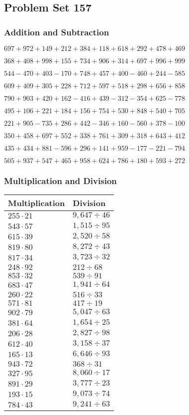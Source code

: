 \hypertarget{problem-set-157}{%
\subsection{Problem Set 157}\label{problem-set-157}}

\hypertarget{addition-and-subtraction}{%
\subsubsection{Addition and
Subtraction}\label{addition-and-subtraction}}

\(697 +972 +149 +212 +384 +118 +618 +292 +478 +469\)

\(368 +408 +998 +155 +734 +906 +314 +697 +996 +999\)

\(544 - 470 +403 - 170 +748 +457 +400 - 460 +244 - 585\)

\(609 +409 +305 +228 +712 +597 +518 +298 +656 +858\)

\(790 +903 +420 +162 - 416 +439 - 312 - 354 +625 - 778\)

\(495 +106 +221 +184 +156 +754 +530 +848 +540 +705\)

\(221 +905 - 735 +286 +442 - 346 +160 - 560 +378 - 100\)

\(350 +458 +697 +552 +338 +761 +309 +318 +643 +412\)

\(435 +434 +881 - 596 +296 +141 +959 - 177 - 221 - 794\)

\(505 +937 +547 +465 +958 +624 +786 +180 +593 +272\)

\hypertarget{multiplication-and-division}{%
\subsubsection{Multiplication and
Division}\label{multiplication-and-division}}

\begin{longtable}[]{@{}ll@{}}
\toprule
Multiplication & Division\tabularnewline
\midrule
\endhead
\(255 \cdot 21\) & \(9,647÷46\)\tabularnewline
\(543 \cdot 57\) & \(1,515÷95\)\tabularnewline
\(615 \cdot 39\) & \(2,520÷58\)\tabularnewline
\(819 \cdot 80\) & \(8,272÷43\)\tabularnewline
\(817 \cdot 34\) & \(3,723÷32\)\tabularnewline
\(248 \cdot 92\) & \(212÷68\)\tabularnewline
\(853 \cdot 32\) & \(539÷91\)\tabularnewline
\(683 \cdot 47\) & \(1,941÷64\)\tabularnewline
\(260 \cdot 22\) & \(516÷33\)\tabularnewline
\(571 \cdot 81\) & \(417÷19\)\tabularnewline
\(902 \cdot 79\) & \(5,047÷63\)\tabularnewline
\(381 \cdot 64\) & \(1,654÷25\)\tabularnewline
\(206 \cdot 28\) & \(2,827÷98\)\tabularnewline
\(612 \cdot 40\) & \(3,158÷37\)\tabularnewline
\(165 \cdot 13\) & \(6,646÷93\)\tabularnewline
\(943 \cdot 72\) & \(368÷31\)\tabularnewline
\(327 \cdot 95\) & \(8,060÷17\)\tabularnewline
\(891 \cdot 29\) & \(3,777÷23\)\tabularnewline
\(193 \cdot 15\) & \(9,073÷74\)\tabularnewline
\(784 \cdot 43\) & \(9,241÷63\)\tabularnewline
\bottomrule
\end{longtable}

